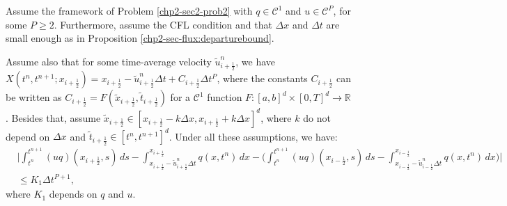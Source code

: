 \begin{prop}
	\label{chp2-sec-flux:prop2}
	Assume the framework of Problem \ref{chp2-sec2-prob2} with $q \in \mathcal{C}^1$  and $u \in \mathcal{C}^P$, for some $P\geq2$. 
	Furthermore, assume the CFL condition and that $\Delta x$ and $ \Delta t $ are small enough as in Proposition \ref{chp2-sec-flux:departurebound}.
	
	Assume also that for some time-average velocity $\tilde{u}^n_{i+\frac{1}{2}}$, we have
	$X(t^n,t^{n+1};x_{i+\frac{1}{2}}) = x_{i+\frac{1}{2}} - \tilde{u}^n_{i+\frac{1}{2}}\Delta t + C_{i+\frac{1}{2}}\Delta t^P$, 
	where the constants $C_{i+\frac{1}{2}}$ can be written as $C_{i+\frac{1}{2}} = F(\tilde{x}_{i+\frac{1}{2}}, \tilde{t}_{i+\frac{1}{2}})$ for 
	a $\mathcal{C}^1$ function $F:[a,b]^d \times [0,T]^d \to \mathbb{R}$ . 
	Besides that, assume $\tilde{x}_{i+\frac{1}{2}} \in [x_{i+\frac{1}{2}}-k\Delta x, x_{i+\frac{1}{2}} + k\Delta x]^d$, 
	where $k$ do not depend on $\Delta x$ and $\tilde{t}_{i+\frac{1}{2}} \in [t^n, t^{n+1}]^d$.
	Under all these assumptions, we have:
	\begin{align*}
		&\bigg|\int_{t^n}^{t^{n+1}} (uq)(x_{i+\frac{1}{2}},s) \,ds 
		-\int^{x_{i+\frac{1}{2}}}_{x_{i+\frac{1}{2}}-\tilde{u}_{i+\frac{1}{2}}^n \Delta t} q(x,t^n)\,dx
		-\bigg( \int_{t^n}^{t^{n+1}} (uq)(x_{i-\frac{1}{2}},s) \,ds 
		-\int^{x_{i-\frac{1}{2}}}_{x_{i-\frac{1}{2}}-\tilde{u}_{i-\frac{1}{2}}^n \Delta t} q(x,t^n)\,dx  \bigg) \bigg| \\
		& \leq K_1 \Delta t^{P+1},
	\end{align*}
	where $K_1$ depends on $q$ and $u$.
\end{prop}
